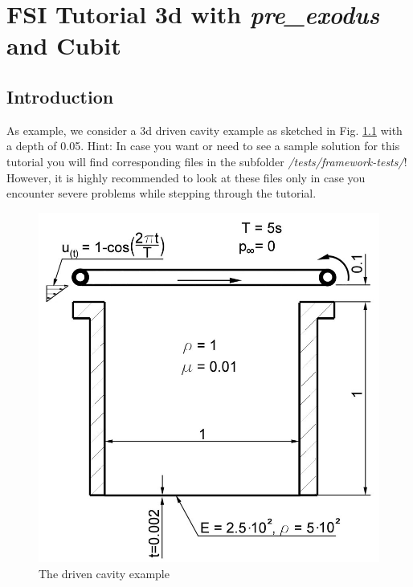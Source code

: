 \newcommand{\prexo}{\emph{pre\_exodus \,}}
\newcommand{\bc}{\emph{bc-file \,}}
\newcommand{\head}{\emph{header-file \,}}

\chapter{FSI Tutorial 3d with \prexo and Cubit}
\label{tut_fsi_preexo:chap}

\section{Introduction}

As example, we consider a 3d driven cavity example as
sketched in Fig. \ref{tut_fsi_preexo:1.1} with a depth of 0.05.
Hint: In case you want or need to see a sample solution for this tutorial 
you will find corresponding files in the \baci{} subfolder \emph{/tests/framework-tests/}!
However, it is highly recommended to look at these files only in case you encounter severe problems
while stepping through the tutorial.
\newline

\begin{figure}[h]
\hfil\includegraphics[scale=0.2]{Bilder/Angabeskizze}

\caption{\label{tut_fsi_preexo:1.1} The driven cavity example}
\end{figure}

